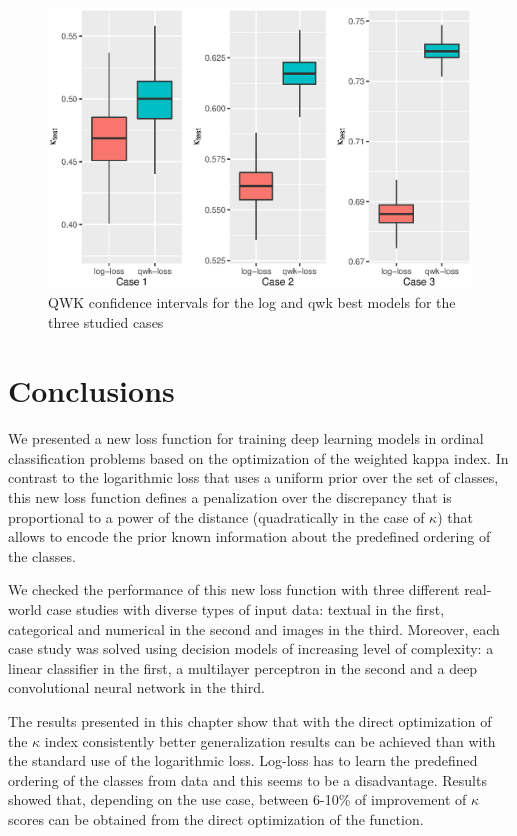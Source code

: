 \begin{figure}[!htb]
	\centering
	\includegraphics[width=\textwidth]{Figures/chapter_loss/boxplots.eps}
	\caption[QWK use cases confidence intervals]{QWK confidence intervals for the log and qwk best models for the three studied cases}
	\label{loss:fig:retine-boxplot}
\end{figure}

\section{Conclusions}\label{loss:conc}

We presented a new loss function for training deep learning models in ordinal classification problems based on the optimization of the weighted kappa index. In contrast to the logarithmic loss that uses a uniform prior over the set of classes, this new loss function defines a penalization over the discrepancy that is proportional to a power of the distance (quadratically in the case of $\kappa$) that allows to encode the prior known information about the predefined ordering of the classes. 

We checked the performance of this new loss function with three different real-world case studies with diverse types of input data: textual in the first, categorical and numerical in the second and images in the third. Moreover, each case study was solved using decision models of increasing level of complexity: a linear classifier in the first, a multilayer perceptron in the second and a deep convolutional neural network in the third. 

The results presented in this chapter show that with the direct optimization of the $\kappa$ index consistently better generalization results can be achieved than with the standard use of the logarithmic loss. Log-loss has to learn the predefined ordering of the classes from data and this seems to be a disadvantage. Results showed that, depending on the use case, between 6-10\% of improvement of $\kappa$ scores can be obtained from the direct optimization of the function.

